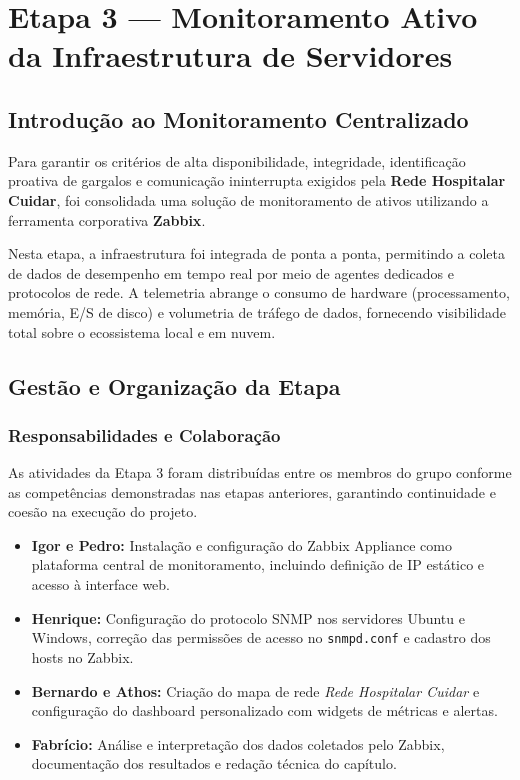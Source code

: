 \documentclass[12pt,a4paper,oneside]{report}
\begin{document}
\chapter{Etapa 3 --- Monitoramento Ativo da Infraestrutura de Servidores}

\section{Introdução ao Monitoramento Centralizado}
Para garantir os critérios de alta disponibilidade, integridade, identificação proativa de gargalos e comunicação ininterrupta exigidos pela \textbf{Rede Hospitalar Cuidar}, foi consolidada uma solução de monitoramento de ativos utilizando a ferramenta corporativa \textbf{Zabbix}.

Nesta etapa, a infraestrutura foi integrada de ponta a ponta, permitindo a coleta de dados de desempenho em tempo real por meio de agentes dedicados e protocolos de rede. A telemetria abrange o consumo de hardware (processamento, memória, E/S de disco) e volumetria de tráfego de dados, fornecendo visibilidade total sobre o ecossistema local e em nuvem.

\section{Gestão e Organização da Etapa}

\subsection{Responsabilidades e Colaboração}
As atividades da Etapa 3 foram distribuídas entre os membros do grupo conforme as competências demonstradas nas etapas anteriores, garantindo continuidade e coesão na execução do projeto.

\begin{itemize}[label=\color{pucblue}$\bullet$]
    \item \textbf{Igor e Pedro:} Instalação e configuração do Zabbix Appliance como plataforma central de monitoramento, incluindo definição de IP estático e acesso à interface web.
    \item \textbf{Henrique:} Configuração do protocolo SNMP nos servidores Ubuntu e Windows, correção das permissões de acesso no \texttt{snmpd.conf} e cadastro dos hosts no Zabbix.
    \item \textbf{Bernardo e Athos:} Criação do mapa de rede \textit{Rede Hospitalar Cuidar} e configuração do dashboard personalizado com widgets de métricas e alertas.
    \item \textbf{Fabrício:} Análise e interpretação dos dados coletados pelo Zabbix, documentação dos resultados e redação técnica do capítulo.
\end{itemize}
\end{document}
